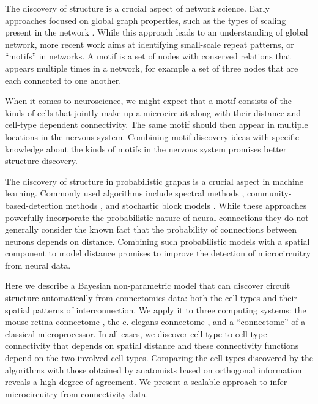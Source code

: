 \documentclass{article}
\begin{document}
The discovery of structure is a crucial aspect of network
science. Early approaches focused on global graph properties, such as
the types of scaling present in the network \autocite
{WattsStrogatz1998} .  While this approach leads to an understanding
of global network, more recent work aims at identifying small-scale
repeat patterns, or “motifs” in networks. 
A motif is a set of nodes with conserved relations that appears
multiple times in a network, for example a set of three nodes that are
each connected to one another. 

When it comes to neuroscience, we might
expect that a motif consists of the kinds of cells that jointly make
up a microcircuit along with their distance and cell-type dependent
connectivity. The same motif should then appear in multiple locations
in the nervous system. Combining motif-discovery ideas with specific
knowledge about the kinds of motifs in the nervous system promises
better structure discovery.

The discovery of structure in probabilistic graphs is a crucial aspect
in machine learning. Commonly used algorithms include spectral methods
\autocite{},   community-based-detection   methods  \autocite{},   and
stochastic block  models \autocite{NowickiSnijdders2001}.  While these
approaches powerfully  incorporate the probabilistic nature of neural
connections \autocite{} they do not generally consider the known fact
that  the  probability  of  connections  between  neurons  depends  on
distance. Combining such probabilistic models with a spatial component
to model distance promises to  improve the detection of microcircuitry
from neural data.

Here we describe a Bayesian non-parametric model that can discover
circuit structure automatically from connectomics data: both the cell
types and their spatial patterns of interconnection. We apply it to
three computing systems: the mouse retina connectome \autocite{}, the
c. elegans connectome \autocite{}, and a ``connectome'' of a classical
microprocessor. In all cases, we discover cell-type to cell-type
connectivity that depends on spatial distance and these connectivity
functions depend on the two involved cell types. Comparing the cell
types discovered by the algorithms with those obtained by anatomists
based on orthogonal information reveals a high degree of agreement. We
present a scalable approach to infer microcircuitry from connectivity
data.
\end{document}
